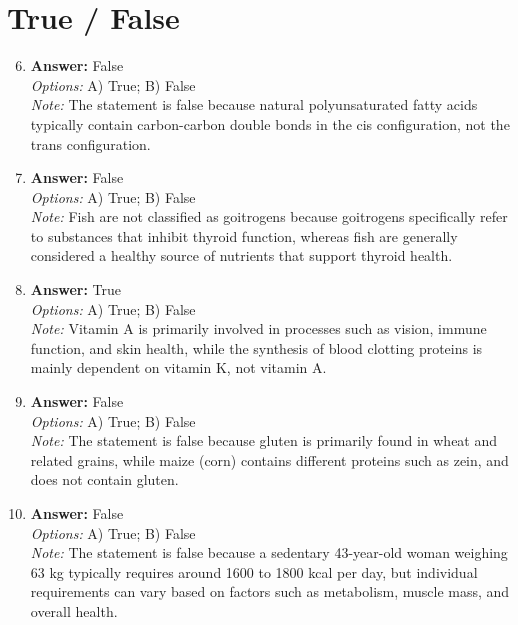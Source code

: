 \documentclass[12pt]{article}
\begin{document}
\section*{True / False}
\begin{enumerate}[label=\arabic*.]
\setcounter{enumi}{5}
\item \textbf{Answer:} False
\\ \textit{Options:} A) True; B) False
\\ \textit{Note:} The statement is false because natural polyunsaturated fatty acids typically contain carbon-carbon double bonds in the cis configuration, not the trans configuration.
\item \textbf{Answer:} False
\\ \textit{Options:} A) True; B) False
\\ \textit{Note:} Fish are not classified as goitrogens because goitrogens specifically refer to substances that inhibit thyroid function, whereas fish are generally considered a healthy source of nutrients that support thyroid health.
\item \textbf{Answer:} True
\\ \textit{Options:} A) True; B) False
\\ \textit{Note:} Vitamin A is primarily involved in processes such as vision, immune function, and skin health, while the synthesis of blood clotting proteins is mainly dependent on vitamin K, not vitamin A.
\item \textbf{Answer:} False
\\ \textit{Options:} A) True; B) False
\\ \textit{Note:} The statement is false because gluten is primarily found in wheat and related grains, while maize (corn) contains different proteins such as zein, and does not contain gluten.
\item \textbf{Answer:} False
\\ \textit{Options:} A) True; B) False
\\ \textit{Note:} The statement is false because a sedentary 43-year-old woman weighing 63 kg typically requires around 1600 to 1800 kcal per day, but individual requirements can vary based on factors such as metabolism, muscle mass, and overall health.
\end{enumerate}
\end{document}
